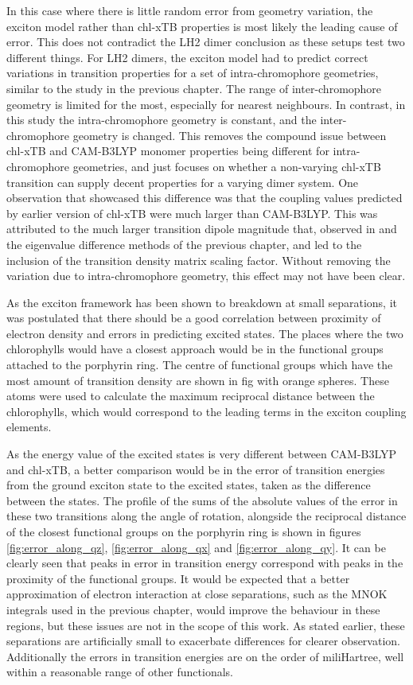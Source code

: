 In this case where there is little random error from geometry variation, the exciton
model rather than chl-xTB properties is most likely the leading cause of error. 
This does not contradict the LH2 dimer conclusion as these setups test two different
things. For LH2 dimers, the exciton model had to predict correct variations in transition
properties for a set of intra-chromophore geometries, similar to the study in the 
previous chapter. The range of inter-chromophore geometry is limited for the most,
especially for nearest neighbours. In contrast, in this study the intra-chromophore 
geometry is constant, and the inter-chromophore geometry is changed. This removes
the compound issue between chl-xTB and CAM-B3LYP monomer properties being different
for intra-chromophore geometries, and just focuses on whether a non-varying chl-xTB
transition can supply decent properties for a varying dimer system. One observation
that showcased this difference was that the coupling values predicted by earlier
version of chl-xTB were much larger than CAM-B3LYP. This was attributed to the much
larger transition dipole magnitude that, observed in \dscf and the eigenvalue difference 
methods of the previous chapter, and led to the inclusion of the transition density
matrix scaling factor. Without removing the variation due to intra-chromophore geometry, 
this effect may not have been clear.

As the exciton framework has been shown to breakdown at small separations, it was
postulated that there should be a good correlation between proximity of electron
density and errors in predicting excited states. The places where the two chlorophylls
would have a closest approach would be in the functional groups attached to the 
porphyrin ring. The centre of functional groups which have the most amount of transition
density are shown in fig with orange spheres. These atoms were used to calculate
the maximum reciprocal distance between the chlorophylls, which would correspond
to the leading terms in the exciton coupling elements.

As the energy value of the excited states is very different between CAM-B3LYP and
chl-xTB, a better comparison would be in the error of transition energies from the
ground exciton state to the excited states, taken as the difference between the 
states. The profile of the sums of the absolute values of the error in these two
transitions along the angle of rotation, alongside the reciprocal distance of the
closest functional groups on the porphyrin ring is shown in figures \ref{fig:error_along_qz}, 
\ref{fig:error_along_qx} and \ref{fig:error_along_qy}. It can be clearly seen that
peaks in error in transition energy correspond with peaks in the proximity of the
functional groups. It would be expected that a better approximation of electron 
interaction at close separations, such as the MNOK integrals used in the previous
chapter, would improve the behaviour in these regions, but these issues are not 
in the scope of this work. As stated earlier, these separations are artificially 
small to exacerbate differences for clearer observation. Additionally the errors 
in transition energies are on the order of miliHartree, well within a reasonable
range of other functionals.

